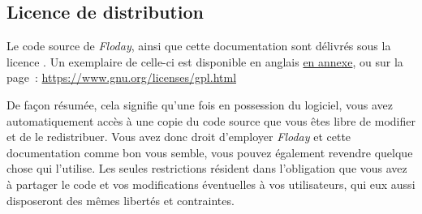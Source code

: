 \subsection{Licence de distribution}

Le code source de \emph{Floday}, ainsi que cette documentation sont délivrés sous la licence .
Un exemplaire de celle-ci est disponible en anglais \hyperref[sec:gpl]{en annexe}, ou sur la page~: \url{https://www.gnu.org/licenses/gpl.html}

De façon résumée, cela signifie qu'une fois en possession du logiciel, vous avez automatiquement accès à une copie du code source que vous êtes libre de modifier et de le redistribuer.
Vous avez donc droit d'employer \emph{Floday} et cette documentation comme bon vous semble, vous pouvez également revendre quelque chose qui l'utilise.
Les seules restrictions résident dans l'obligation que vous avez à partager le code et vos modifications éventuelles à vos utilisateurs, qui eux aussi disposeront des mêmes libertés et contraintes.

